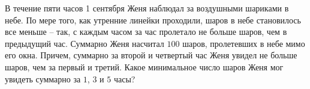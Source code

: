 
В течение пяти часов 1 сентября Женя наблюдал за воздушными шариками в небе. 
По мере того, как утренние линейки проходили, шаров в небе становилось все меньше -- так, 
с каждым часом за час пролетало не больше шаров, чем в предыдущий час. 
Суммарно Женя насчитал $100$ шаров, пролетевших в небе мимо его окна. 
Причем, суммарно за второй и четвертый час Женя увидел не больше шаров, чем за первый и третий. 
Какое минимальное число шаров Женя мог увидеть суммарно за $1$, $3$ и $5$ часы?

\soultionSection

